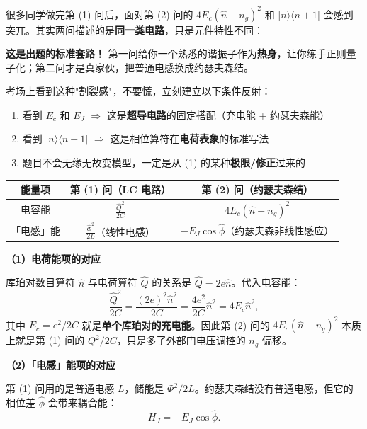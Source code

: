 很多同学做完第 (1) 问后，面对第 (2) 问的 $4E_c(\hat{n}-n_g)^2$ 和 $|n\rangle\langle n+1|$ 会感到突兀。其实两问描述的是\textbf{同一类电路}，只是元件特性不同：

\begin{warnbox}
\textbf{这是出题的标准套路！} 第一问给你一个熟悉的谐振子作为\textbf{热身}，让你练手正则量子化；第二问才是真家伙，把普通电感换成约瑟夫森结。

考场上看到这种"割裂感"，不要慌，立刻建立以下条件反射：
\begin{enumerate}[nosep]
    \item 看到 $E_c$ 和 $E_J$ $\Rightarrow$ 这是\textbf{超导电路}的固定搭配（充电能 + 约瑟夫森能）
    \item 看到 $|n\rangle\langle n+1|$ $\Rightarrow$ 这是相位算符在\textbf{电荷表象}的标准写法
    \item 题目不会无缘无故变模型，一定是从 (1) 的某种\textbf{极限/修正}过来的
\end{enumerate}
\end{warnbox}

\begin{insightbox}[两问哈密顿量的对应关系]
\begin{center}
\renewcommand{\arraystretch}{1.5}
\begin{tabular}{|c|c|c|}
\hline
\textbf{能量项} & \textbf{第 (1) 问（LC 电路）} & \textbf{第 (2) 问（约瑟夫森结）} \\
\hline
电容能 & $\displaystyle \frac{\hat{Q}^2}{2C}$ & $\displaystyle 4E_c(\hat{n}-n_g)^2$ \\
\hline
「电感」能 & $\displaystyle \frac{\hat{\Phi}^2}{2L}$（线性电感） & $-E_J\cos\hat{\phi}$（约瑟夫森非线性感应） \\
\hline
\end{tabular}
\end{center}
\end{insightbox}

\textbf{（1）电荷能项的对应}

库珀对数目算符 $\hat{n}$ 与电荷算符 $\hat{Q}$ 的关系是 $\hat{Q} = 2e\hat{n}$。代入电容能：
\[
\frac{\hat{Q}^2}{2C} = \frac{(2e)^2\hat{n}^2}{2C} = \frac{4e^2}{2C}\hat{n}^2 = 4E_c\hat{n}^2,
\]
其中 $E_c = e^2/2C$ 就是\textbf{单个库珀对的充电能}。因此第 (2) 问的 $4E_c(\hat{n}-n_g)^2$ 本质上就是第 (1) 问的 $Q^2/2C$，只是多了外部门电压调控的 $n_g$ 偏移。

\textbf{（2）「电感」能项的对应}

第 (1) 问用的是普通电感 $L$，储能是 $\Phi^2/2L$。约瑟夫森结没有普通电感，但它的相位差 $\hat{\phi}$ 会带来耦合能：
\[
H_J = -E_J\cos\hat{\phi}.
\]

